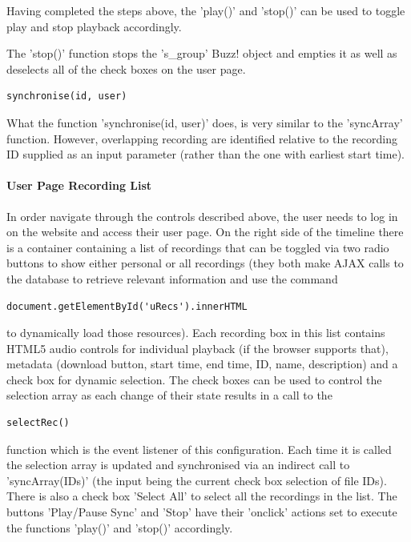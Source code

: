 \documentclass{l3proj}
\begin{document}
Having completed the steps above, the 'play()' and 'stop()' can be used to toggle play and stop playback accordingly.

The 'stop()' function stops the 's\_group' Buzz! object and empties it as well as deselects all of the check boxes on the user page.

\begin{verbatim}
synchronise(id, user)
\end{verbatim}

What the function 'synchronise(id, user)' does, is very similar to the 'syncArray' function. However, overlapping recording are identified relative to the recording ID supplied as an input parameter (rather than the one with earliest start time).

\paragraph{User Page Recording List}

In order navigate through the controls described above, the user needs to log in on the website and access their user page. On the right side of the timeline there is a container containing a list of recordings that can be toggled via two radio buttons to show either personal or all recordings (they both make AJAX calls to the database to retrieve relevant information and use the command

\begin{verbatim}
document.getElementById('uRecs').innerHTML
\end{verbatim}

to dynamically load those resources). Each recording box in this list contains HTML5 audio controls for individual playback (if the browser supports that), metadata (download button, start time, end time, ID, name, description) and a check box for dynamic selection. The check boxes can be used to control the selection array as each change of their state results in a call to the

\begin{verbatim}
selectRec()
\end{verbatim}

function which is the event listener of this configuration. Each time it is called the selection array is updated and synchronised via an indirect call to 'syncArray(IDs)' (the input being the current check box selection of file IDs). There is also a check box 'Select All' to select all the recordings in the list. The buttons 'Play/Pause Sync' and 'Stop' have their 'onclick' actions set to execute the functions 'play()' and 'stop()' accordingly.
\end{document}
